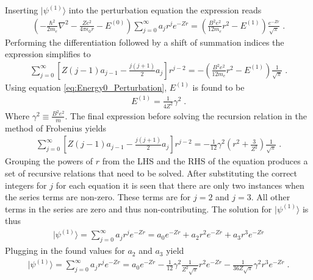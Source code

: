         \noindent Inserting $\vert \psi^{(1)} \rangle$ into the perturbation equation the expression reads 
        \begin{align}
            \left(- \frac{\hbar^2}{2m_e} \nabla^2 - \frac{Ze^2}{4\pi \epsilon_0 r} - E^{(0)} \right) \sum_{j = 0}^\infty a_j r^j e^{-Zr} = \left(\frac{B^2e^2}{12m_e}r^2 - E^{(1)} \right) \frac{e^{-Zr}}{\sqrt{\pi}}\;.
        \end{align}
        \noindent Performing the differentiation followed by a shift of summation indices the expression simplifies to
        \begin{align}
            \sum_{j = 0}^\infty \left[ Z(j - 1)a_{j-1} - \frac{j(j+1)}{2}a_j \right]r^{j-2} = -\left(\frac{B^2e^2}{12m_e}r^2 - E^{(1)} \right) \frac{1}{\sqrt{\pi}}\;.\label{eq:Result_r^2_sum}
        \end{align}
        \noindent Using equation \eqref{eq:Energy0_Perturbation}, $E^{(1)}$ is found to be 
        \begin{align}
            E^{(1)} = \frac{1}{4Z^2} \gamma^2\;.
        \end{align}
        \noindent Where $\gamma^2 \equiv \frac{B^2 e^2}{m}$. The final expression before solving the recursion relation in the method of Frobenius yields 
        \begin{align}
            \sum_{j = 0}^\infty \left[ Z(j - 1)a_{j-1} - \frac{j(j+1)}{2}a_j \right]r^{j-2} = -\frac{1}{12} \gamma^2 \left(r^2 + \frac{3}{Z^2} \right) \frac{1}{\sqrt{\pi}}\;.
        \end{align}
        Grouping the powers of $r$ from the LHS and the RHS of the equation produces a set of recursive relations that need to be solved. After substituting the correct integers for $j$ for each equation it is seen that there are only two instances when the series terms are non-zero. These terms are for $j = 2$ and $j = 3$. All other terms in the series are zero and thus non-contributing. The solution for $\vert \psi^{(1)} \rangle$ is thus 
        \begin{align}
            \vert \psi^{(1)} \rangle = \sum_{j = 0}^\infty a_j r^j e^{-Zr} = a_0 e^{-Zr} + a_2 r^2 e^{-Zr} + a_3 r^3 e^{-Zr}
        \end{align}
        \noindent Plugging in the found values for $a_2$ and $a_3$ yield 
        \begin{align}
            \vert \psi^{(1)} \rangle = \sum_{j = 0}^\infty a_j r^j e^{-Zr} = a_0 e^{-Zr} -\frac{1}{12} \gamma^2 \frac{1}{Z^2 \sqrt{\pi}} r^2 e^{-Zr} -\frac{1}{36Z\sqrt{\pi}} \gamma^2 r^3 e^{-Zr}\;.
        \end{align}
